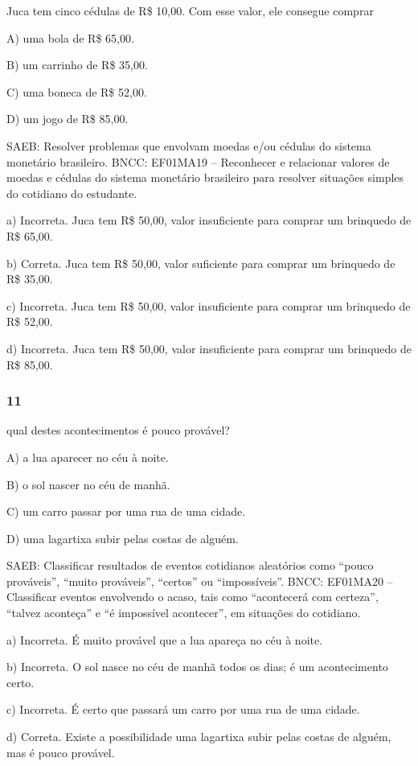 Juca tem cinco cédulas de R\$ 10,00. Com esse valor, ele consegue comprar

A) uma bola de R\$ 65,00.

B) um carrinho de R\$ 35,00.

C) uma boneca de R\$ 52,00.

D) um jogo de R\$ 85,00.

SAEB: Resolver problemas que envolvam moedas e/ou cédulas do
sistema monetário brasileiro.
BNCC: EF01MA19 -- Reconhecer e relacionar valores de moedas e cédulas do
sistema monetário brasileiro para resolver situações simples do
cotidiano do estudante.

a) Incorreta. Juca tem R\$ 50,00, valor insuficiente para comprar um brinquedo de R\$ 65,00.

b) Correta. Juca tem R\$ 50,00, valor suficiente para comprar um brinquedo de R\$ 35,00.

c) Incorreta. Juca tem R\$ 50,00, valor insuficiente para comprar um brinquedo de R\$ 52,00.

d) Incorreta. Juca tem R\$ 50,00, valor insuficiente para comprar um brinquedo de R\$ 85,00.

\subsubsection{11}\label{section-112}

qual destes acontecimentos é pouco provável?

A) a lua aparecer no céu à noite.

B) o sol nascer no céu de manhã.

C) um carro passar por uma rua de uma cidade.

D) uma lagartixa subir pelas costas de alguém.

SAEB: Classificar resultados de eventos cotidianos aleatórios como
``pouco prováveis'', ``muito prováveis'', ``certos'' ou ``impossíveis''.
BNCC: EF01MA20 -- Classificar eventos envolvendo o acaso, tais como
``acontecerá com certeza'', ``talvez aconteça'' e ``é impossível
acontecer'', em situações do cotidiano.

a) Incorreta. É muito provável que a lua apareça no céu à noite.

b) Incorreta. O sol nasce no céu de manhã todos os dias; é um acontecimento certo.

c) Incorreta. É certo que passará um carro por uma rua de uma cidade.

d) Correta. Existe a possibilidade uma lagartixa subir pelas costas de alguém, mas é pouco provável.

